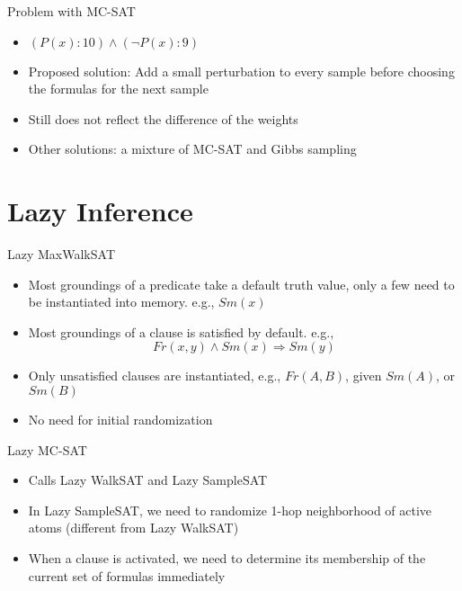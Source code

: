 \documentclass{beamer}
\begin{document}
\begin{frame}{Problem with MC-SAT}
	\begin{itemize}
		\item $(P(x): 10) \wedge (\neg P(x): 9)$
		\item Proposed solution: Add a small perturbation to every sample before
			choosing the formulas for the next sample
		\item Still does not reflect the difference of the weights
		\pause

		\item Other solutions: a mixture of MC-SAT and Gibbs sampling

	\end{itemize}
\end{frame}

\section{Lazy Inference}

\begin{frame}{Lazy MaxWalkSAT}

	\begin{itemize}
		\item Most groundings of a predicate take a default truth value,
			only a few need to be instantiated into memory. e.g., $Sm(x)$
		\item Most groundings of a clause is satisfied by default. e.g.,
			\[
			Fr(x, y) \wedge Sm(x) \Rightarrow Sm(y)
			\]
		\item Only unsatisfied clauses are instantiated, e.g., $Fr(A, B)$,
			given $Sm(A)$, or $Sm(B)$
		\item No need for initial randomization
	\end{itemize}

\end{frame}

\begin{frame}{Lazy MC-SAT}
	\begin{itemize}
		\item Calls Lazy WalkSAT and Lazy SampleSAT

		\item In Lazy SampleSAT, we need to randomize 1-hop neighborhood of
			active atoms (different from Lazy WalkSAT)

		\item When a clause is activated, we need to determine its membership
			of the current set of formulas immediately

	\end{itemize} \end{frame}
\end{document}
